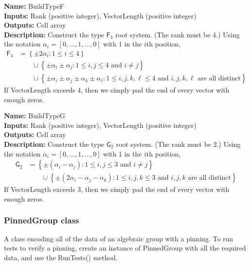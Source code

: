 \documentclass[12pt]{article}
\theoremstyle{definition}
\numberwithin{theorem}{subsection}
\newcommand{\lb}{\left\{}
\newcommand{\rb}{\right\}}
\newcommand{\tbf}{\textbf}
\newcommand{\noi}{\noindent}
\begin{document}
\begin{framed}
\noi \tbf{Name:} BuildTypeF \\
\noi \tbf{Inputs:} Rank (positive integer), VectorLength (positive integer) \\
\noi \tbf{Outputs:} Cell array  \\
\noi \tbf{Description:} Construct the type $\mathsf{F}_4$ root system. (The rank must be 4.) Using the notation $\alpha_i = [0, \ldots, 1, \ldots, 0]$ with 1 in the $i$th position, 
\begin{align*}
	\mathsf{F}_4 &=
	 \lb \pm 2 \alpha_i : 1 \le i \le 4 \rb \\
	 &\qquad \cup \lb \pm \alpha_i \pm \alpha_j : 1 \le i, j \le 4 \text{ and } i \neq j \rb  \\
	 &\qquad \cup \lb \pm \alpha_i \pm \alpha_j \pm \alpha_k \pm \alpha_\ell : 1 \le i,j,k, \ell \le 4 \text{ and } i,j,k,\ell \text{ are all distinct} \rb
\end{align*}
If VectorLength exceeds $4$, then we simply pad the end of every vector with enough zeros.
\end{framed}

\begin{framed}
\noi \tbf{Name:} BuildTypeG \\
\noi \tbf{Inputs:} Rank (positive integer), VectorLength (positive integer) \\
\noi \tbf{Outputs:} Cell array  \\
\noi \tbf{Description:} Construct the type $\mathsf{G}_2$ root system. (The rank must be 2.) Using the notation $\alpha_i = [0, \ldots, 1, \ldots, 0]$ with 1 in the $i$th position,
\begin{align*}
	\mathsf{G}_2 &= \lb \pm (\alpha_i - \alpha_j) : 1 \le i, j \le 3 \text{ and } i \neq j \rb \\
	&\qquad \cup \lb \pm ( 2 \alpha_i - \alpha_j - \alpha_k)  : 1 \le i, j, k \le 3 \text{ and } i,j,k \text{ are all distinct} \rb
\end{align*}
If VectorLength exceeds $3$, then we simply pad the end of every vector with enough zeros.
\end{framed}

\subsubsection{PinnedGroup class}

A class encoding all of the data of an algebraic group with a pinning. To run tests to verify a pinning, create an instance of PinnedGroup with all the required data, and use the RunTests() method.
\end{document}
